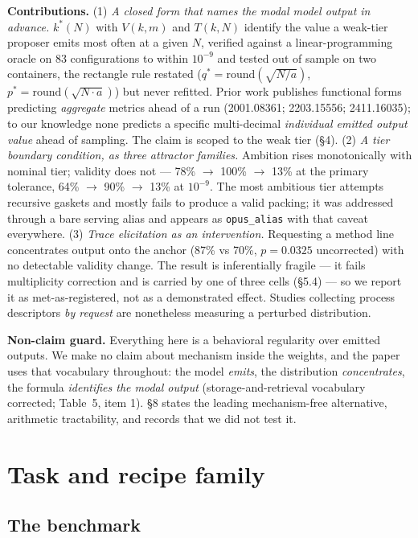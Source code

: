 \documentclass[11pt]{article}
\begin{document}
\textbf{Contributions.} (1) \textit{A closed form that names the modal model output in advance.} $k^{*}(N)$ with
$V(k, m)$ and $T(k, N)$ identify the value a weak-tier proposer emits most often at a given $N$,
verified against a linear-programming oracle on 83 configurations to within $10^{-9}$ and tested out
of sample on two containers, the rectangle rule restated ($q^{*} = \mathrm{round}(\sqrt{N/a})$,
$p^{*} = \mathrm{round}(\sqrt{N \cdot a})$) but never refitted. Prior work publishes functional forms predicting
\textit{aggregate} metrics ahead of a run (2001.08361; 2203.15556; 2411.16035); to our knowledge none
predicts a specific multi-decimal \textit{individual emitted output value} ahead of sampling. The claim
is scoped to the weak tier (\S4). (2) \textit{A tier boundary condition, as three attractor families.}
Ambition rises monotonically with nominal tier; validity does not --- 78\% $\rightarrow$ 100\% $\rightarrow$ 13\% at the
primary tolerance, 64\% $\rightarrow$ 90\% $\rightarrow$ 13\% at $10^{-9}$. The most ambitious tier attempts recursive gaskets
and mostly fails to produce a valid packing; it was addressed through a bare serving alias and
appears as \texttt{opus\_alias} with that caveat everywhere. (3) \textit{Trace elicitation as an intervention.}
Requesting a method line concentrates output onto the anchor (87\% vs 70\%, $p = 0.0325$
uncorrected) with no detectable validity change. The result is inferentially fragile --- it fails
multiplicity correction and is carried by one of three cells (\S5.4) --- so we report it as
met-as-registered, not as a demonstrated effect. Studies collecting process descriptors \textit{by
request} are nonetheless measuring a perturbed distribution.

\textbf{Non-claim guard.} Everything here is a behavioral regularity over emitted outputs. We make
no claim about mechanism inside the weights, and the paper uses that vocabulary throughout: the
model \textit{emits}, the distribution \textit{concentrates}, the formula \textit{identifies the modal output}
(storage-and-retrieval vocabulary corrected; Table~5, item 1). \S8 states the leading
mechanism-free alternative, arithmetic tractability, and records that we did not test it.

\section{Task and recipe family}

\subsection{The benchmark}
\end{document}

